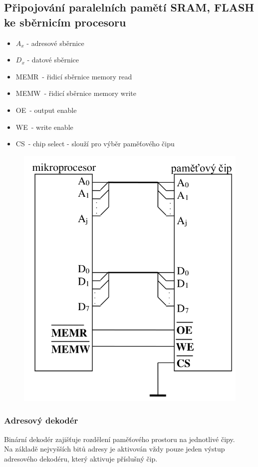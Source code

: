 \subsection{Připojování paralelních pamětí SRAM, FLASH ke sběrnicím procesoru}
\begin{itemize}
    \item \(A_x\) - adresové sběrnice
    \item \(D_x\) - datové sběrnice
    \item MEMR\ - řidicí sběrnice memory read
    \item MEMW\ - řidicí sběrnice memory write
    \item OE\ - output enable
    \item WE\ - write enable
    \item CS\ - chip select - slouží pro výběr paměťového čipu
\end{itemize}
\newpage
\begin{figure}[h!]
    \centering
    \includegraphics[scale = 0.3]{img/MemConnect.png}
\end{figure}

\subsubsection*{Adresový dekodér}
Binární dekodér zajišťuje rozdělení
paměťového prostoru na jednotlivé čipy.\\
Na základě nejvyšších bitů adresy je aktivován vždy pouze jeden výstup adresového dekodéru, který aktivuje příslušný čip.\\

